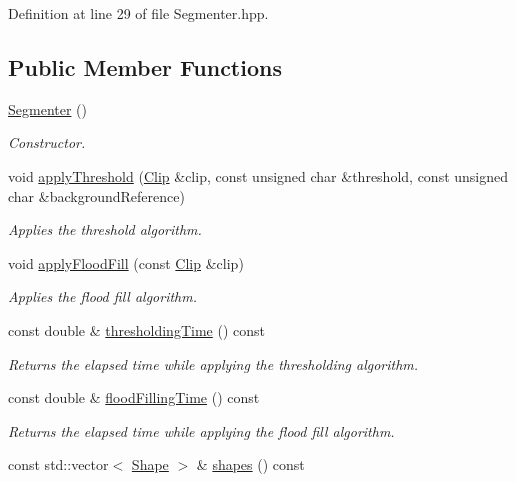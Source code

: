 Definition at line 29 of file Segmenter.hpp.\subsection*{Public Member Functions}
\begin{CompactItemize}
\item 
\hyperlink{class_segmenter_d39ec3bda31be180820aa0bdca7b125d}{Segmenter} ()
\begin{CompactList}\small\item\em Constructor. \item\end{CompactList}\item 
void \hyperlink{class_segmenter_6854315e3320f9d9a8ece14cbb8570ee}{applyThreshold} (\hyperlink{class_clip}{Clip} \&clip, const unsigned char \&threshold, const unsigned char \&backgroundReference)
\begin{CompactList}\small\item\em Applies the threshold algorithm. \item\end{CompactList}\item 
void \hyperlink{class_segmenter_327c88f2d55cb606a67ce778c06cf426}{applyFloodFill} (const \hyperlink{class_clip}{Clip} \&clip)
\begin{CompactList}\small\item\em Applies the flood fill algorithm. \item\end{CompactList}\item 
const double \& \hyperlink{class_segmenter_52f771c61d667df4f552ee73dc9f22e7}{thresholdingTime} () const 
\begin{CompactList}\small\item\em Returns the elapsed time while applying the thresholding algorithm. \item\end{CompactList}\item 
const double \& \hyperlink{class_segmenter_e7c93cb16e314baeb713bbd6ca9b667b}{floodFillingTime} () const 
\begin{CompactList}\small\item\em Returns the elapsed time while applying the flood fill algorithm. \item\end{CompactList}\item 
const std::vector$<$ \hyperlink{class_shape}{Shape} $>$ \& \hyperlink{class_segmenter_f2dd7f34c8b0f902323005335e41bd57}{shapes} () const 

\end{CompactItemize}
